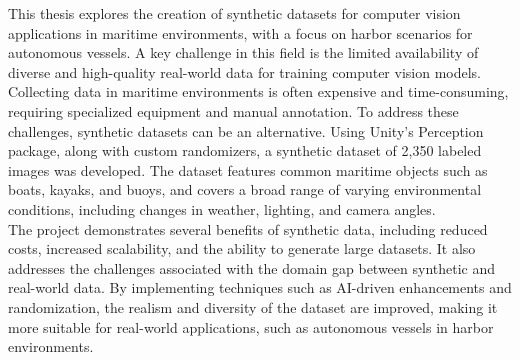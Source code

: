 
This thesis explores the creation of synthetic datasets for computer vision applications in maritime environments, with a focus on harbor scenarios for autonomous vessels. A key challenge in this field is the limited availability of diverse and high-quality real-world data for training computer vision models. Collecting data in maritime environments is often expensive and time-consuming, requiring specialized equipment and manual annotation. To address these challenges, synthetic datasets can be an alternative. Using Unity’s Perception package, along with custom randomizers, a synthetic dataset of 2,350 labeled images was developed. The dataset features common maritime objects such as boats, kayaks, and buoys, and covers a broad range of varying environmental conditions, including changes in weather, lighting, and camera angles.\\

\noindent The project demonstrates several benefits of synthetic data, including reduced costs, increased scalability, and the ability to generate large datasets. It also addresses the challenges associated with the domain gap between synthetic and real-world data. By implementing techniques such as AI-driven enhancements and randomization, the realism and diversity of the dataset are improved, making it more suitable for real-world applications, such as autonomous vessels in harbor environments.
